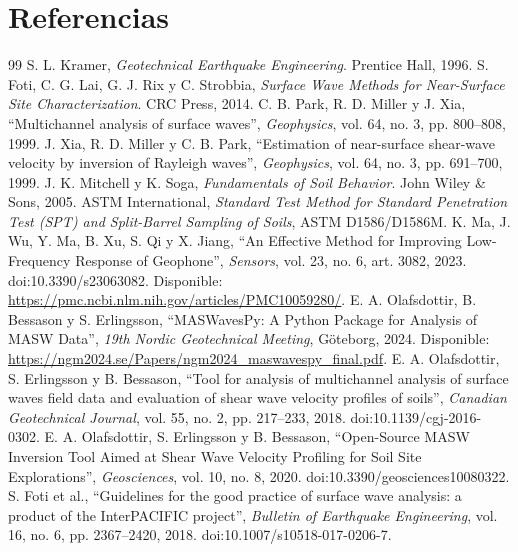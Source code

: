 \documentclass[11pt,a4paper]{article}
\begin{document}
	\section{Referencias}
	\renewcommand{\refname}{}
	\vspace{-1.7em}
	\begin{thebibliography}{99}\footnotesize
		\setlength{\itemsep}{0.02em}
		 S. L. Kramer, \textit{Geotechnical Earthquake Engineering}. Prentice Hall, 1996.
		 S. Foti, C. G. Lai, G. J. Rix y C. Strobbia, \textit{Surface Wave Methods for Near-Surface Site Characterization}. CRC Press, 2014.
		 C. B. Park, R. D. Miller y J. Xia, ``Multichannel analysis of surface waves'', \textit{Geophysics}, vol. 64, no. 3, pp. 800--808, 1999.
		 J. Xia, R. D. Miller y C. B. Park, ``Estimation of near-surface shear-wave velocity by inversion of Rayleigh waves'', \textit{Geophysics}, vol. 64, no. 3, pp. 691--700, 1999.
		 J. K. Mitchell y K. Soga, \textit{Fundamentals of Soil Behavior}. John Wiley \& Sons, 2005.
		 ASTM International, \textit{Standard Test Method for Standard Penetration Test (SPT) and Split-Barrel Sampling of Soils}, ASTM D1586/D1586M.
		 K. Ma, J. Wu, Y. Ma, B. Xu, S. Qi y X. Jiang, ``An Effective Method for Improving Low-Frequency Response of Geophone'', \textit{Sensors}, vol. 23, no. 6, art. 3082, 2023. doi:10.3390/s23063082. Disponible: \url{https://pmc.ncbi.nlm.nih.gov/articles/PMC10059280/}.
		 E. A. Olafsdottir, B. Bessason y S. Erlingsson, ``MASWavesPy: A Python Package for Analysis of MASW Data'', \textit{19th Nordic Geotechnical Meeting}, G\"oteborg, 2024. Disponible: \url{https://ngm2024.se/Papers/ngm2024_maswavespy_final.pdf}.
		 E. A. Olafsdottir, S. Erlingsson y B. Bessason, ``Tool for analysis of multichannel analysis of surface waves field data and evaluation of shear wave velocity profiles of soils'', \textit{Canadian Geotechnical Journal}, vol. 55, no. 2, pp. 217--233, 2018. doi:10.1139/cgj-2016-0302.
		 E. A. Olafsdottir, S. Erlingsson y B. Bessason, ``Open-Source MASW Inversion Tool Aimed at Shear Wave Velocity Profiling for Soil Site Explorations'', \textit{Geosciences}, vol. 10, no. 8, 2020. doi:10.3390/geosciences10080322.
		 S. Foti et al., ``Guidelines for the good practice of surface wave analysis: a product of the InterPACIFIC project'', \textit{Bulletin of Earthquake Engineering}, vol. 16, no. 6, pp. 2367--2420, 2018. doi:10.1007/s10518-017-0206-7.

\end{thebibliography}
\end{document}
